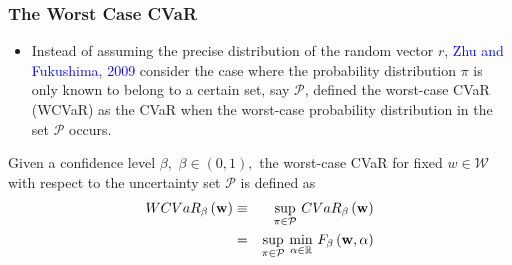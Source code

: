 \documentclass[pdf,9pt,xcolor=dvipsnames,hide notes]{beamer}
\begin{document}
%
%	
%	
%	
%	
%	
%	
%	
%	
%
%	
%

\begin{frame}[label=frame2d]
	\frametitle{The Worst Case CVaR}
	
	\begin{itemize}
		\justifying

\item Instead of assuming the precise distribution of the random vector $r$,
\textcolor{blue}{Zhu and Fukushima}, \textcolor{blue}{2009} consider the case where the probability distribution $\pi$
is only known to belong to a certain set, say $\mathcal{P}$, defined the
worst-case CVaR (WCVaR) as the CVaR when the worst-case probability
distribution in the set $\mathcal{P}$ occurs.

\end{itemize}

\begin{definition}
	Given a confidence level $\beta ,$ $\beta \in (0,1),$ the worst-case CVaR
	for fixed $w\in \mathcal{W}$ with respect to the uncertainty set $\mathcal{P}
	$ is defined as
	\begin{eqnarray}
	WCVaR_{\beta }\left( \mathbf{w}\right) &\equiv &\underset{\pi \in \mathcal{P}%
	}{\sup }~ CVaR_{\beta }\left( \mathbf{w}\right)  \notag \\
	&=&\underset{\pi \in \mathcal{P}}{\sup }~\underset{\alpha \in
		\mathbb{R}
	}{\min }~F_{\beta }\left(\mathbf{w},\alpha \right)  \label{14}
	\end{eqnarray}
\end{definition}

\end{frame}
\end{document}
